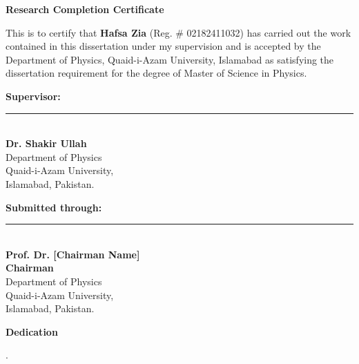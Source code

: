 \documentclass[12pt,a4paper]{report}
\begin{document}
\newpage
\begin{titlepage}
	 \begin{center}
		{\Large \textbf{Research Completion Certificate}}
	\end{center}
	\vspace{0.4cm}
	This is to certify that \textbf{Hafsa Zia} (Reg. \# 02182411032) has carried out the work contained in this dissertation under my supervision and is accepted by the Department of Physics, Quaid-i-Azam University, Islamabad as satisfying the dissertation requirement for the degree of Master of Science in Physics.\\
	\vspace{1cm}

	\begin{flushright}
		\textbf{Supervisor:}\\[6pt]
		\vspace{1cm}
		\rule{3.5cm}{0.4pt}\\
		\textbf{Dr. Shakir Ullah}\\
		Department of Physics\\
		Quaid-i-Azam University,\\
		Islamabad, Pakistan.
	\end{flushright}
	\vspace{1cm}
	\textbf{Submitted through:}\\[12pt]

	\begin{flushleft}
		\rule{3.5cm}{0.4pt}\\
		\textbf{Prof. Dr. [Chairman Name]}\\
		\textbf{Chairman}\\
		Department of Physics\\
		Quaid-i-Azam University,\\
		Islamabad, Pakistan.
	\end{flushleft}
\end{titlepage}

\newpage
\begin{titlepage}
 \begin{center}
	{\Large \textbf{Dedication}}
\end{center}
\vspace{0.4cm}
.\\
\end{titlepage}
\end{document}
